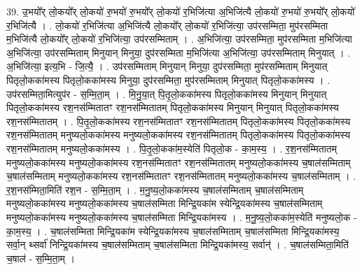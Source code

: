 \documentclass[17pt]{extarticle}
\begin{document}
39. उ॒भयो᳚र् लो॒कयो᳚र् लो॒कयो॑ रु॒भयो॑ रु॒भयो᳚र् लो॒कयो॑ र॒भिजि॑त्या अ॒भिजि॑त्यै लो॒कयो॑ रु॒भयो॑ रु॒भयो᳚र् लो॒कयो॑ र॒भिजि॑त्यै । . लो॒कयो॑ र॒भिजि॑त्या अ॒भिजि॑त्यै लो॒कयो᳚र् लो॒कयो॑ र॒भिजि॑त्या॒ उप॑रसम्मिता॒ मुप॑रसम्मिता म॒भिजि॑त्यै लो॒कयो᳚र् लो॒कयो॑ र॒भिजि॑त्या॒ उप॑रसम्मिताम् । . अ॒भिजि॑त्या॒ उप॑रसम्मिता॒ मुप॑रसम्मिता म॒भिजि॑त्या अ॒भिजि॑त्या॒ उप॑रसम्मिताम् मिनुयान् मिनुया॒ दुप॑रसम्मिता म॒भिजि॑त्या अ॒भिजि॑त्या॒ उप॑रसम्मिताम् मिनुयात् । . अ॒भिजि॑त्या॒ इत्य॒भि - जि॒त्यै॒ । . उप॑रसम्मिताम् मिनुयान् मिनुया॒ दुप॑रसम्मिता॒ मुप॑रसम्मिताम् मिनुयात् पितृलो॒कका॑मस्य पितृलो॒कका॑मस्य मिनुया॒ दुप॑रसम्मिता॒ मुप॑रसम्मिताम् मिनुयात् पितृलो॒कका॑मस्य । . उप॑रसम्मिता॒मित्युप॑र - स॒म्मि॒ता॒म् । . मि॒नु॒या॒त् पि॒तृ॒लो॒कका॑मस्य पितृलो॒कका॑मस्य मिनुयान् मिनुयात् पितृलो॒कका॑मस्य रश॒नस॑म्मितातꣳ रश॒नस॑म्मितातम् पितृलो॒कका॑मस्य मिनुयान् मिनुयात् पितृलो॒कका॑मस्य रश॒नस॑म्मितातम् । . पि॒तृ॒लो॒कका॑मस्य रश॒नस॑म्मितातꣳ रश॒नस॑म्मितातम् पितृलो॒कका॑मस्य पितृलो॒कका॑मस्य रश॒नस॑म्मितातम् मनुष्यलो॒कका॑मस्य मनुष्यलो॒कका॑मस्य रश॒नस॑म्मितातम् पितृलो॒कका॑मस्य पितृलो॒कका॑मस्य रश॒नस॑म्मितातम् मनुष्यलो॒कका॑मस्य । . पि॒तृ॒लो॒कका॑म॒स्येति॑ पितृलो॒क - का॒म॒स्य॒ । . र॒श॒नस॑म्मितातम् मनुष्यलो॒कका॑मस्य मनुष्यलो॒कका॑मस्य रश॒नस॑म्मितातꣳ रश॒नस॑म्मितातम् मनुष्यलो॒कका॑मस्य च॒षाल॑सम्मिताम् च॒षाल॑सम्मिताम् मनुष्यलो॒कका॑मस्य रश॒नस॑म्मितातꣳ रश॒नस॑म्मितातम् मनुष्यलो॒कका॑मस्य च॒षाल॑सम्मिताम् । . र॒श॒नस॑म्मिता॒मिति॑ रश॒न - स॒म्मि॒ता॒म् । . म॒नु॒ष्य॒लो॒कका॑मस्य च॒षाल॑सम्मिताम् च॒षाल॑सम्मिताम् मनुष्यलो॒कका॑मस्य मनुष्यलो॒कका॑मस्य च॒षाल॑सम्मिता मिन्द्रि॒यका॑म स्येन्द्रि॒यका॑मस्य च॒षाल॑सम्मिताम् मनुष्यलो॒कका॑मस्य मनुष्यलो॒कका॑मस्य च॒षाल॑सम्मिता मिन्द्रि॒यका॑मस्य । . म॒नु॒ष्य॒लो॒कका॑म॒स्येति॑ मनुष्यलो॒क - का॒म॒स्य॒ । . च॒षाल॑सम्मिता मिन्द्रि॒यका॑म स्येन्द्रि॒यका॑मस्य च॒षाल॑सम्मिताम् च॒षाल॑सम्मिता मिन्द्रि॒यका॑मस्य॒ सर्वा॒न् थ्सर्वा॑ निन्द्रि॒यका॑मस्य च॒षाल॑सम्मिताम् च॒षाल॑सम्मिता मिन्द्रि॒यका॑मस्य॒ सर्वान्॑ । . च॒षाल॑सम्मिता॒मिति॑ च॒षाल॑ - स॒म्मि॒ता॒म् । \newline
\end{document}
